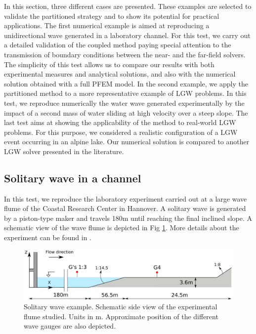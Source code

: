 In this section, three different cases are presented. These examples are selected to validate the partitioned strategy and to show its potential for practical applications. The first numerical example is aimed at reproducing a unidirectional wave generated in a laboratory channel. For this test, we carry out a detailed validation of the coupled method paying special attention to the transmission of boundary conditions between the near- and the far-field solvers. The simplicity of this test allows us to compare our results with both experimental measures and analytical solutions, and also with the numerical solution obtained with a full PFEM model. In the second example, we apply the partitioned method to a more representative example of LGW problems.  In this test, we reproduce numerically the water wave generated experimentally by the impact of a second mass of water sliding at high velocity over a steep slope. The last test aims at showing the applicability of the method to real-world LGW problems. For this purpose, we considered a realistic configuration of a LGW event occurring in an alpine lake. Our numerical solution is compared to another LGW solver presented in the literature.



\subsection{Solitary wave in a channel}
\label{Example1}

In this test, we reproduce the laboratory experiment carried out at a large wave flume of the Coastal Research Center in Hannover. A solitary wave is generated by a piston-type maker and travels 180m until reaching the final inclined slope. A schematic view of the wave flume is depicted in Fig \ref{solitary_wave_channel}. More details about the experiment can be found in \cite{krautwald2020,krautwald2022,krautwald2021}.

\begin{figure} [htb]
    \centering
    \includegraphics[width=\textwidth]{img/coupling/solitary_wave_channel.pdf}
    \caption{Solitary wave example. Schematic side view of the experimental flume studied. Units in m. Approximate position of the different wave gauges are also depicted.}
    \label{solitary_wave_channel}
\end{figure}

